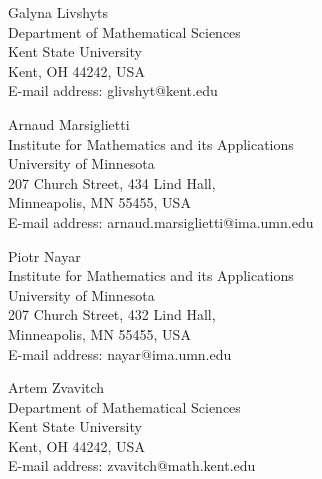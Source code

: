 \documentclass[11pt]{article}
\newcommand{\1}{\mathbf{{1}}}
\theoremstyle{definition}
\begin{document}
\vspace{1cm}



\noindent Galyna Livshyts \\
Department of Mathematical Sciences \\
Kent State University \\
Kent, OH 44242, USA \\
E-mail address: glivshyt@kent.edu

\vspace{0.8cm}

\noindent Arnaud Marsiglietti \\
Institute for Mathematics and its Applications \\
University of Minnesota \\
207 Church Street, 434 Lind Hall, \\
Minneapolis, MN 55455, USA \\
E-mail address: arnaud.marsiglietti@ima.umn.edu

\vspace{0.8cm}

\noindent Piotr Nayar \\
Institute for Mathematics and its Applications \\
University of Minnesota \\
207 Church Street, 432 Lind Hall, \\
Minneapolis, MN 55455, USA \\
E-mail address: nayar@ima.umn.edu

\vspace{0.8cm}

\noindent Artem Zvavitch \\
Department of Mathematical Sciences \\
Kent State University \\
Kent, OH 44242, USA \\
E-mail address: zvavitch@math.kent.edu
\end{document}
